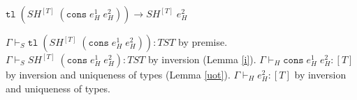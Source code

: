 \begin{case}
$\mathtt{tl}\;(SH^{[T]}\;(\mathtt{cons}\;e_{H}^{1}\;e_{H}^{2}))\rightarrow SH^{[T]}\;e_{H}^{2}$

$\Gamma\vdash_{S}\mathtt{tl}\;(SH^{[T]}\;(\mathtt{cons}\;e_{H}^{1}\;e_{H}^{2})):TST$ by premise.  $\Gamma\vdash_{S}SH^{[T]}\;(\mathtt{cons}\;e_{H}^{1}\;e_{H}^{2}):TST$ by inversion (Lemma \ref{i}).  $\Gamma\vdash_{H}\mathtt{cons}\;e_{H}^{1}\;e_{H}^{2}:[T]$ by inversion and uniqueness of types (Lemma \ref{uot}).  $\Gamma\vdash_{H}e_{H}^{2}:[T]$ by inversion and uniqueness of types.
\end{case}